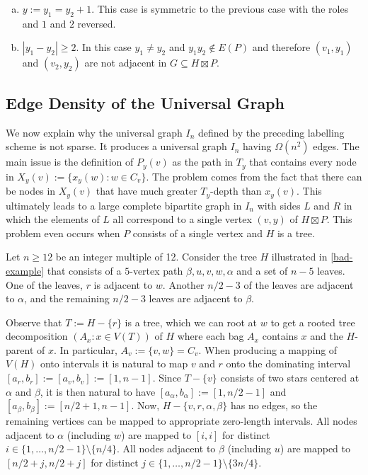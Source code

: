 \documentclass{patmorin}
\begin{document}
\begin{enumerate}
\begin{enumerate}[(a)]
        \item $y:=y_1=y_{2}+1$. This case is symmetric to the previous case with the roles and $1$ and $2$ reversed.

        \item $|y_1-y_2|\ge 2$.  In this case $y_1\neq y_2$ and $y_1y_2\not\in E(P)$ and therefore $(v_1,y_1)$ and $(v_2,y_2)$ are not adjacent in $G\subseteq H\boxtimes P$.
    \end{enumerate}
\end{enumerate}

\subsection{Edge Density of the Universal Graph}
\label{density-lower-bound}

We now explain why the universal graph $I_n$ defined by the preceding labelling scheme is not sparse.  It produces a universal graph $I_n$ having $\Omega(n^2)$ edges.  The main issue is the definition of $P_y(v)$ as the path in $T_y$ that contains every node in $X_y(v):=\{x_y(w):w\in C_v\}$.  The problem comes from the fact that there can be nodes in $X_y(v)$ that have much greater $T_y$-depth than $x_y(v)$.  This ultimately leads to a large complete bipartite graph in $I_n$ with sides $L$ and $R$ in which the elements of $L$ all correspond to a single vertex $(v,y)$ of $H\boxtimes P$.  This problem even occurs when $P$ consists of a single vertex and $H$ is a tree.

Let $n\ge 12$ be an integer multiple of 12. Consider the tree $H$ illustrated in \cref{bad-example} that consists of a $5$-vertex path $\beta,u,v,w,\alpha$ and a set of $n-5$ leaves.  One of the leaves, $r$ is adjacent to $w$. Another $n/2-3$ of the leaves are adjacent to $\alpha$, and the remaining $n/2-3$ leaves are adjacent to $\beta$.

Observe that $T:=H-\{r\}$ is a tree, which we can root at $w$ to get a rooted tree decomposition $(A_x:x\in V(T))$ of $H$ where each bag $A_x$ contains $x$ and the $H$-parent of $x$.  In particular, $A_v:=\{v,w\}=C_v$.  When producing a mapping of $V(H)$ onto intervals it is natural to map $v$ and $r$ onto the dominating interval $[a_r,b_r]:=[a_v,b_v]:=[1,n-1]$.  Since $T-\{v\}$ consists of two stars centered at $\alpha$ and $\beta$, it is then natural to have $[a_\alpha,b_\alpha]:=[1, n/2-1]$ and $[a_\beta,b_\beta]:=[ n/2+1,n-1]$. Now, $H-\{v,r,\alpha,\beta\}$ has no edges, so the remaining vertices can be mapped to appropriate zero-length intervals. All nodes adjacent to $\alpha$ (including $w$) are mapped to $[i,i]$ for distinct $i\in\{1,\ldots, n/2-1\}\setminus\{n/4\}$. All nodes adjacent to $\beta$ (including $u$) are mapped to $[n/2+j, n/2+j]$ for distinct $j\in\{1,\ldots, n/2-1\}\setminus\{3n/4\}$.
\end{document}
